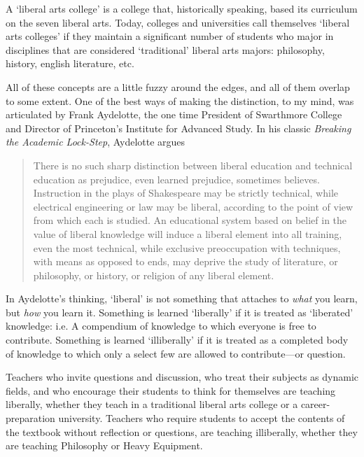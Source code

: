 A `liberal arts college' is a college that, historically speaking, based its curriculum on the seven liberal arts. Today, colleges and universities call themselves `liberal arts colleges' if they maintain a significant number of students who major in disciplines that are considered `traditional' liberal arts majors: philosophy, history, english literature, etc. 

All of these concepts are a little fuzzy around the edges, and all of them overlap to some extent. One of the best ways of making the distinction, to my mind, was articulated by Frank Aydelotte, the one time President of Swarthmore College and Director of Princeton's Institute for Advanced Study. In his classic \emph{Breaking the Academic Lock-Step}, Aydelotte argues

\begin{quote}

There is no such sharp distinction between liberal education and technical education as prejudice, even learned prejudice, sometimes believes. Instruction in the plays of Shakespeare may be strictly technical, while electrical engineering or law may be liberal, according to the point of view from which each is studied. An educational system based on belief in the value of liberal knowledge will induce a liberal element into all training, even the most technical, while exclusive preoccupation with techniques, with means as opposed to ends, may deprive the study of literature, or philosophy, or history, or religion of any liberal element. ~\citep[p. 8]{Aydelotte:1944wy}
\end{quote}

In Aydelotte's thinking, `liberal' is not something that attaches to \emph{what} you learn, but \emph{how} you learn it. Something is learned `liberally' if it is treated as `liberated' knowledge: i.e. A compendium of knowledge to which everyone is free to contribute. Something is learned `illiberally' if it is treated as a completed body of knowledge to which only a select few are allowed to contribute---or question. 

Teachers who invite questions and discussion, who treat their subjects as dynamic fields, and who encourage their students to think for themselves are teaching liberally, whether they teach in a traditional liberal arts college or a career-preparation university. Teachers who require students to accept the contents of the textbook without reflection or questions, are teaching illiberally, whether they are teaching Philosophy or Heavy Equipment.

